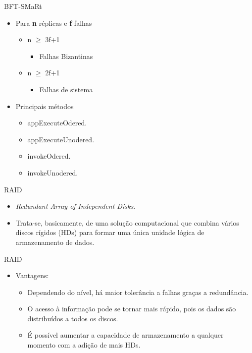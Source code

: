 \begin{frame}{BFT-SMaRt}
	\begin{itemize}
		\item Para \textbf{n} réplicas e \textbf{f} falhas
		\begin{itemize}
			\item n $\geq$ 3f+1
			\begin{itemize}
				\item Falhas Bizantinas
			\end{itemize}
			\item n $\geq$ 2f+1
			\begin{itemize}
				\item Falhas de sistema
			\end{itemize}
		\end{itemize}
		
		\item Principais métodos
		\begin{itemize}
			\item appExecuteOdered.	
			\item appExecuteUnodered.
			\item invokeOdered.
			\item invokeUnodered.
		\end{itemize}
		
	\end{itemize}
\end{frame}



\begin{frame}{RAID}
	
	\begin{itemize}
		\item \textit{Redundant Array of Independent Disks}.
		\item Trata-se, basicamente, de uma solução computacional que combina vários discos rígidos (HDs) para formar uma única unidade lógica de armazenamento de dados.
	\end{itemize}
\end{frame}

\begin{frame}{RAID}
	
	\begin{itemize}
		\item Vantagens:
		\begin{itemize}
			\item Dependendo do nível, há maior tolerância a falhas graças a redundância.
			\item O acesso à informação pode se tornar mais rápido, pois os dados são distribuídos a todos os discos.
			\item É possível aumentar a capacidade de armazenamento a qualquer momento com a adição de mais HDs.
		\end{itemize}
	\end{itemize}
\end{frame}

